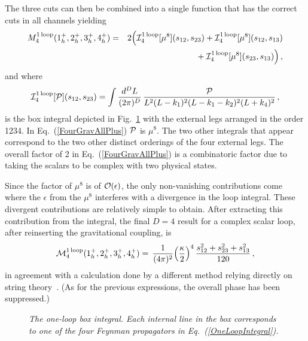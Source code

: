 \documentclass[12pt]{livrev}
\begin{document}
The three cuts can then be combined into a single function that has the correct
cuts in all channels yielding 
\begin{eqnarray}
M_4^{\rm 1 \,loop}(1^+_h, 2^+_h, 3^+_h, 4^+_h)  & = &
 2 \Bigl({\cal I}_4^{\rm 1\, loop}[\mu^8](s_{12},s_{23}) + 
       {\cal I}_4^{\rm 1\, loop}[\mu^8](s_{12},s_{13}) \nonumber \\
& &
\null   + {\cal I}_4^{\rm 1\, loop}[\mu^8](s_{23},s_{13}) \Bigr)\,, 
\label{FourGravAllPlus}
\end{eqnarray}
%
and where
%
\begin{equation}
{\cal I}_4^{\rm 1\, loop}[{\cal P}](s_{12},s_{23}) = 
\int {d^D L \over (2\pi)^D}
\, {{\cal P} \over L^2 (L - k_1)^2
       (L - k_1 - k_2)^2
        (L + k_4)^2  } \,,
\label{OneLoopIntegral} 
\end{equation}
%
is the box integral depicted in
Fig.~\ref{figure:OneloopIntegral} with the external legs arranged in
the order 1234. In Eq.~(\ref{FourGravAllPlus}) ${\cal P}$ is $\mu^8$.
The two other integrals that appear correspond to the two other
distinct orderings of the four external legs.  The overall factor of 2
in Eq.~(\ref{FourGravAllPlus}) is a combinatoric factor due to taking
the scalars to be complex with two physical states.

Since the factor of $\mu^8$ is of ${\cal O}(\epsilon)$, the only non-vanishing
contributions come where the $\epsilon$ from the $\mu^8$ interferes with 
a divergence in the loop integral.  These divergent contributions
are relatively simple  to obtain.  After extracting this contribution from
the integral, the final $D=4$ result for a complex scalar loop, after
reinserting the gravitational coupling, is
%
\begin{equation}
{\cal M}_4^{\rm 1\, loop} (1^+_h, 2^+_h, 3^+_h, 4^+_h) 
   =  \, {1 \over (4 \pi)^2} \Bigl({\kappa\over 2} \Bigr)^4\, 
     {s_{12}^2 + s_{23}^2 + s_{13}^2 \over 120} \,, 
\label{FourGravPlus}
\end{equation}
%
in agreement with a calculation done by a different
method relying directly on string theory~\cite{DunbarNorridge95}. 
(As for the previous expressions, the overall phase has been suppressed.)

\begin{figure}[h]
  \def\epsfsize#1#2{0.5#1}
  \centerline{}
  \caption{\it The one-loop box integral. Each internal 
  line in the box corresponds to one of the four Feynman propagators in 
   Eq.~(\ref{OneLoopIntegral}).}
  \label{figure:OneloopIntegral}
\end{figure}
\end{document}
